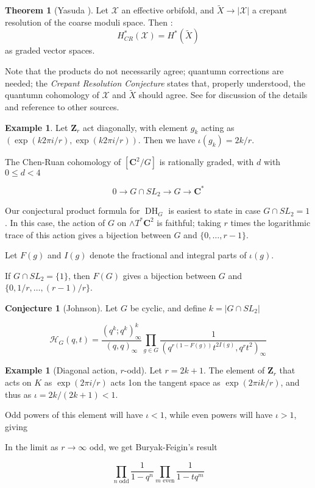 \documentclass{amsart}[12pt]
\theoremstyle{definition}
\newtheorem{theorem}[dummy]{Theorem}
\newtheorem{example}[dummy]{Example}
\newtheorem{conjecture}[dummy]{Conjecture}
\newcommand{\Z}{\mathbf{Z}}
\newcommand{\C}{\mathbf{C}}
\DeclareMathOperator{\DC}{DH}
\begin{document}
\begin{theorem}[Yasuda \cite{yasuda}] \label{thm:yasuda}
Let $\mathcal{X}$ an effective orbifold, and $\widetilde{X}\to|\mathcal{X}|$ a crepant resolution of the coarse moduli space.  Then :
$$H_{CR}^*(\mathcal{X})=H^*(\widetilde{X})$$
as graded vector spaces.  
\end{theorem}

Note that the products do not necessarily agree; quantumn corrections are needed; the \emph{Crepant Resolution Conjecture} states that, properly understood, the quantumn cohomology of $\mathcal{X}$ and $\widetilde{X}$ should agree.  See \cite{CoatesRuan} for discussion of the details and reference to other sources.


\begin{example}
Let $\Z_r$ act diagonally, with element $g_k$ acting as $(\exp(k2\pi i/r),\exp(k2\pi i/r))$.  Then we have $\iota(g_k)=2k/r$.
\end{example}




The Chen-Ruan cohomology of $[\C^2/G]$ is rationally graded, with $d$ with $0\leq d < 4$


$$0\to G\cap SL_2\to G \to \C^*$$








Our conjectural product formula for $\DC_G$ is easiest to state in case $G\cap SL_2=1$.  In this case, the action of $G$ on $\wedge T^*\C^2$ is faithful; taking $r$ times the logarithmic trace of this action gives a bijection between $G$ and $\{0,\dots, r-1\}$.


Let $F(g)$ and $I(g)$ denote the fractional and integral parts of $\iota(g)$. 

If $G\cap SL_2=\{1\}$, then $F(G)$ gives a bijection between $G$ and $\{0, 1/r,\dots, (r-1)/r\}$.
\begin{conjecture}[Johnson] \label{conj:CR}
Let $G$ be cyclic, and define $k=|G\cap SL_2|$

$$\mathcal{H}_G(q,t)= \frac{(q^k;q^k)^k_\infty}{(q,q)_\infty} \prod_{g\in G}\frac{1}{(q^{r(1-F(g))} t^{2I(g)},q^rt^2)_\infty}$$

\end{conjecture}


\begin{example}[Diagonal action, $r$-odd]
Let $r=2k+1$.   The element of $\Z_r$ that acts on $K$ as $\exp(2\pi i/r)$ acts 1on the tangent space as $\exp(2\pi i k/r)$, and thus as $\iota=2k/(2k+1)<1$.  

Odd powers of this element will have $\iota<1$, while even powers will have $\iota>1$, giving 

In the limit as $r\to\infty$ odd, we get Buryak-Feigin's result

$$\prod_{n \text{ odd}} \frac{1}{1-q^n}\prod_{m \text{ even}}\frac{1}{1-tq^m}$$
\end{example}
\end{document}
